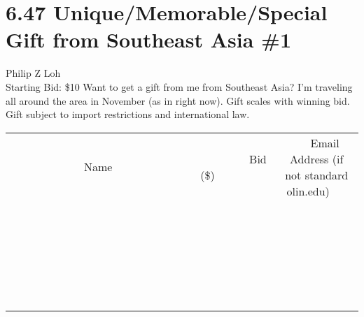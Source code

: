 \documentclass[11pt]{article}
\begin{document}
\section*{6.47 Unique/Memorable/Special Gift from Southeast Asia \#1}
Philip Z Loh
\\
Starting Bid: \$10
\newline
Want to get a gift from me from Southeast Asia? I'm traveling all around the area in November (as in right now). Gift scales with winning bid. Gift subject to import restrictions and international law.
\\[6ex]
\begin{tabular}{c c c}
~~~~~~~~~~~~~Name~~~~~~~~~~~~~ & ~~~~~~~~~Bid (\$)~~~~~~~~~  & ~~~Email Address (if not standard olin.edu)~~~\\
 & & \\
\hline
 & & \\
\hline
 & & \\
\hline
 & & \\
\hline
 & & \\
\hline
 & & \\
\hline
 & & \\
\hline
 & & \\
\hline
 & & \\
\hline
 & & \\
\hline
 & & \\
\hline
 & & \\
\hline
 & & \\
\hline
 & & \\
\hline
 & & \\
\hline
 & & \\
\hline
 & & \\
\hline
 & & \\
\hline
 & & \\
\hline
 & & \\
\hline
 & & \\
\hline
 & & \\
\hline
 & & \\
\hline
 & & \\
\hline
 & & \\
\hline
 & & \\
\hline
\end{tabular}
\newpage
\end{document}
